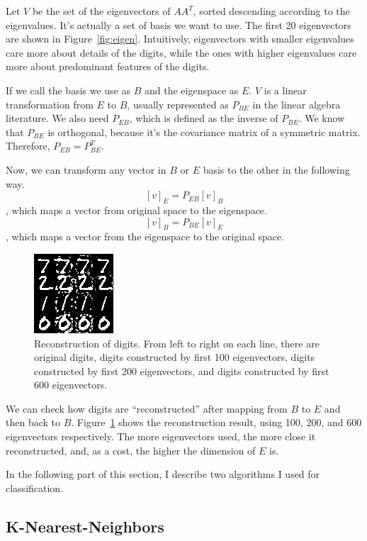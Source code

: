 \documentclass[10pt]{article}
\begin{document}
Let $V$ be the set of the eigenvectors of $AA^T$, sorted descending
according to the eigenvalues. It's actually a set of basis we want to
use. The first 20 eigenvectors are shown in Figure~\ref{fig:eigen}.
Intuitively, eigenvectors with smaller eigenvalues care more about
details of the digits, while the ones with higher eigenvalues care
more about predominant features of the digits.

If we call the basis we use as $B$ and the eigenspace as $E$. $V$
is a linear transformation from $E$ to $B$, usually represented as
$P_{BE}$ in the linear algebra literature. We also need $P_{EB}$,
which is defined as the inverse of $P_{BE}$. We know that $P_{BE}$ is
orthogonal, because it's the covariance matrix of a symmetric matrix.
Therefore, $P_{EB} = P_{BE}^T$.

Now, we can transform any vector in $B$ or $E$ basis to the other in
the following way.
$$[v]_E = P_{EB} [v]_B$$, which maps a vector from original space to
the eigenspace.
$$[v]_B = P_{BE} [v]_E$$, which maps a vector from the eigenspace to
the original space.

\begin{figure}
\centering
\includegraphics[]{test.png}
\caption{Reconstruction of digits. From left to right on each line,
there are original digits, digits constructed by first 100
eigenvectors, digits constructed by first 200 eigenvectors, and digits
constructed by first 600 eigenvectors. }
\label{fig:test}
\end{figure}

We can check how digits are ``reconstructed'' after mapping from $B$ to
$E$ and then back to $B$. Figure~\ref{fig:test} shows the
reconstruction result, using 100, 200, and 600 eigenvectors
respectively. The more eigenvectors used, the more close it
reconstructed, and, as a cost, the higher the dimension of $E$ is.

In the following part of this section, I describe two algorithms I
used for classification.

\subsection{K-Nearest-Neighbors}
\end{document}
